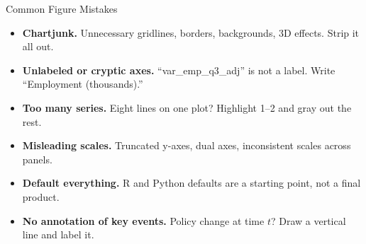 \begin{frame}{Common Figure Mistakes}
  \small
  \begin{itemize}\setlength\itemsep{1pt}
    \item \textbf{Chartjunk.} Unnecessary gridlines, borders, backgrounds, 3D effects. Strip it all out.

    \item \textbf{Unlabeled or cryptic axes.} ``var\_emp\_q3\_adj'' is not a label. Write ``Employment (thousands).''

    \item \textbf{Too many series.} Eight lines on one plot? Highlight 1--2 and gray out the rest.

    \item \textbf{Misleading scales.} Truncated y-axes, dual axes, inconsistent scales across panels.

    \item \textbf{Default everything.} R and Python defaults are a starting point, not a final product.

    \item \textbf{No annotation of key events.} Policy change at time $t$? Draw a vertical line and label it.
  \end{itemize}
\end{frame}

